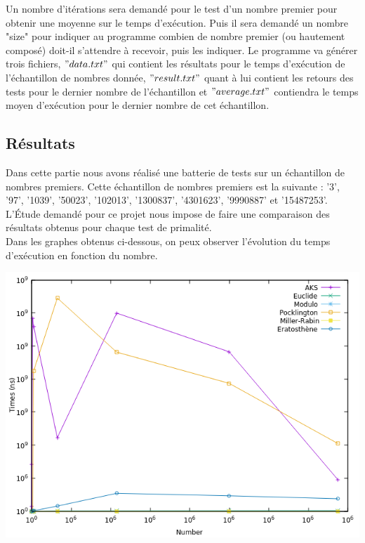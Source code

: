 Un nombre d'itérations sera demandé pour le test d'un nombre premier pour obtenir une moyenne sur le temps d'exécution. Puis il sera demandé un nombre "size" pour indiquer au programme combien de nombre premier (ou hautement composé) doit-il s'attendre à recevoir, puis les indiquer. Le programme va générer trois fichiers, $"data.txt"$ qui contient les résultats pour le temps d'exécution de l'échantillon de nombres donnée, $"result.txt"$ quant à lui contient les retours des tests pour le dernier nombre de l'échantillon et $"average.txt"$ contiendra le temps moyen d'exécution pour le dernier nombre de cet échantillon.
	
		\subsection{Résultats}
	Dans cette partie nous avons réalisé une batterie de tests sur un échantillon de nombres premiers. Cette échantillon de nombres premiers est la suivante : '3', '97', '1039', '50023', '102013', '1300837', '4301623', '9990887' et '15487253'. L’Étude demandé pour ce projet nous impose de faire une comparaison des résultats obtenus pour chaque test de primalité.\\
	Dans les graphes obtenus ci-dessous, on peux observer l'évolution du temps d'exécution en fonction du nombre.	
	
		\begin{center}\includegraphics[scale=0.6]{result.png}\end{center}
	

